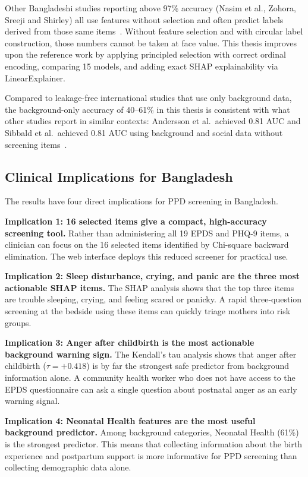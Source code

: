 Other Bangladeshi studies reporting above 97\% accuracy (Nasim et al., Zohora, Sreeji and Shirley) all use features without selection and often predict labels derived from those same items~\cite{nasim2024novel, zohora2024machine, sreeji2026predicting}.
Without feature selection and with circular label construction, those numbers cannot be taken at face value.
This thesis improves upon the reference work by applying principled selection with correct ordinal encoding, comparing 15 models, and adding exact SHAP explainability via LinearExplainer.

Compared to leakage-free international studies that use only background data, the background-only accuracy of 40--61\% in this thesis is consistent with what other studies report in similar contexts: Andersson et al.\ achieved 0.81 AUC and Sibbald et al.\ achieved 0.81 AUC using background and social data without screening items~\cite{andersson2021predicting, sibbald2025identifying}.

\subsection{Clinical Implications for Bangladesh}
\label{ch4-subsec-clinical}

The results have four direct implications for PPD screening in Bangladesh.

\textbf{Implication 1: 16 selected items give a compact, high-accuracy screening tool.}
Rather than administering all 19 EPDS and PHQ-9 items, a clinician can focus on the 16 selected items identified by Chi-square backward elimination.
The web interface deploys this reduced screener for practical use.

\textbf{Implication 2: Sleep disturbance, crying, and panic are the three most actionable SHAP items.}
The SHAP analysis shows that the top three items are trouble sleeping, crying, and feeling scared or panicky.
A rapid three-question screening at the bedside using these items can quickly triage mothers into risk groups.

\textbf{Implication 3: Anger after childbirth is the most actionable background warning sign.}
The Kendall's tau analysis shows that anger after childbirth ($\tau = +0.418$) is by far the strongest safe predictor from background information alone.
A community health worker who does not have access to the EPDS questionnaire can ask a single question about postnatal anger as an early warning signal.

\textbf{Implication 4: Neonatal Health features are the most useful background predictor.}
Among background categories, Neonatal Health (61\%) is the strongest predictor.
This means that collecting information about the birth experience and postpartum support is more informative for PPD screening than collecting demographic data alone.

